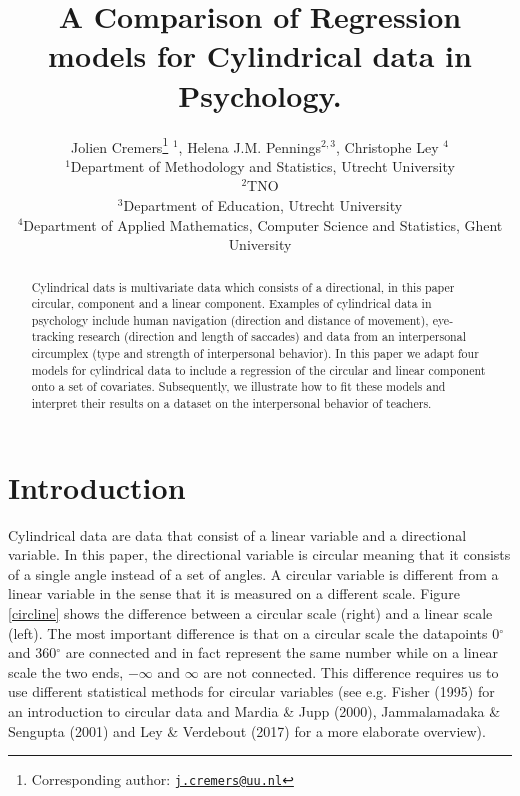 \documentclass[11pt,]{article}
\title{A Comparison of Regression models for Cylindrical data in Psychology.}
\author{Jolien Cremers\footnote{Corresponding author:
  \href{mailto:j.cremers@uu.nl}{\nolinkurl{j.cremers@uu.nl}}} \(^1\),
Helena J.M. Pennings\(^{2,3}\), Christophe Ley \(^{4}\)\\
\(^1\)Department of Methodology and Statistics, Utrecht University\\
\(^2\)TNO\\
\(^3\)Department of Education, Utrecht University\\
\(^4\)Department of Applied Mathematics, Computer Science and
Statistics, Ghent University}
\date{}
\begin{document}
\maketitle
\begin{abstract}
Cylindrical dats is multivariate data which consists of a directional,
in this paper circular, component and a linear component. Examples of
cylindrical data in psychology include human navigation (direction and
distance of movement), eye-tracking research (direction and length of
saccades) and data from an interpersonal circumplex (type and strength
of interpersonal behavior). In this paper we adapt four models for
cylindrical data to include a regression of the circular and linear
component onto a set of covariates. Subsequently, we illustrate how to
fit these models and interpret their results on a dataset on the
interpersonal behavior of teachers.
\end{abstract}

\section{Introduction}\label{Introduction}

Cylindrical data are data that consist of a linear variable and a
directional variable. In this paper, the directional variable is
circular meaning that it consists of a single angle instead of a set of
angles. A circular variable is different from a linear variable in the
sense that it is measured on a different scale. Figure \ref{circline}
shows the difference between a circular scale (right) and a linear scale
(left). The most important difference is that on a circular scale the
datapoints 0\(^\circ\) and 360\(^\circ\) are connected and in fact
represent the same number while on a linear scale the two ends,
\(-\infty\) and \(\infty\) are not connected. This difference requires
us to use different statistical methods for circular variables (see e.g.
Fisher (1995) for an introduction to circular data and Mardia \& Jupp
(2000), Jammalamadaka \& Sengupta (2001) and Ley \& Verdebout (2017) for
a more elaborate overview).
\end{document}
